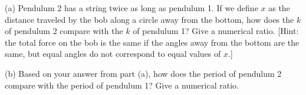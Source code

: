 (a) Pendulum 2 has a string twice as long as pendulum 1.
If we define $x$ as the distance traveled by the bob along a
circle away from the bottom, how does the $k$ of pendulum 2
compare with the $k$ of pendulum 1? Give a numerical ratio.
[Hint: the total force on the bob is the same if the angles
away from the bottom are the same, but equal angles do not
correspond to equal values of $x$.]

(b) Based on your answer from part (a), how does the period
of pendulum 2 compare with the period of pendulum 1?
Give a numerical ratio.

